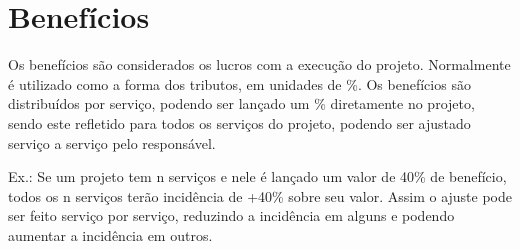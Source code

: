 \chapter{Benefícios}

Os benefícios são considerados os lucros com a execução do projeto. Normalmente é utilizado como a forma dos tributos, em unidades de \%. Os benefícios são distribuídos por serviço, podendo ser lançado um \% diretamente no projeto, sendo este refletido para todos os serviços do projeto, podendo ser ajustado serviço a serviço pelo responsável.

Ex.: Se um projeto tem n serviços e nele é lançado um valor de 40\% de benefício, todos os n serviços terão incidência de +40\% sobre seu valor. Assim o ajuste pode ser feito serviço por serviço, reduzindo a incidência em alguns e podendo aumentar a incidência em outros.